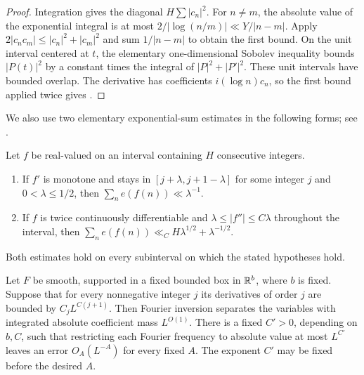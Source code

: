 \begin{proof}
Integration gives the diagonal $H\sum|c_n|^2$. For $n\ne m$, the
absolute value of the exponential integral is at most
$2/|\log(n/m)|\ll Y/|n-m|$. Apply
$2|c_nc_m|\le |c_n|^2+|c_m|^2$ and sum $1/|n-m|$ to obtain the first
bound. On the unit interval centered at $t$, the elementary
one-dimensional Sobolev inequality bounds $|P(t)|^2$ by a constant
times the integral of $|P|^2+|P'|^2$. These unit intervals have bounded
overlap. The derivative has coefficients $i(\log n)c_n$, so the first
bound applied twice gives .
\end{proof}

We also use two elementary exponential-sum estimates in the following
forms; see \cite[Corollary~16.6 and Theorem~16.7]{MontgomeryVaughanII}.

\begin{lemma}\label{lem:derivative-tests}
Let $f$ be real-valued on an interval containing $H$ consecutive
integers.
\begin{enumerate}
\item If $f'$ is monotone and stays in
$[j+\lambda,j+1-\lambda]$ for some integer $j$ and
$0<\lambda\le1/2$, then $\sum_n e(f(n))\ll\lambda^{-1}$.
\item If $f$ is twice continuously differentiable and
$\lambda\le|f''|\le C\lambda$ throughout the interval, then
$\sum_n e(f(n))\ll_C H\lambda^{1/2}+\lambda^{-1/2}$.
\end{enumerate}
Both estimates hold on every subinterval on which the stated
hypotheses hold.
\end{lemma}

\begin{lemma}\label{lem:fourier-separation}
Let $F$ be smooth, supported in a fixed bounded box in $\mathbb R^b$, where
$b$ is fixed. Suppose that for every nonnegative integer $j$ its
derivatives of order $j$ are bounded by $C_jL^{C(j+1)}$.
Then Fourier inversion separates the variables with integrated
absolute coefficient mass $L^{O(1)}$.
There is a fixed $C'>0$, depending on $b,C$, such that restricting
each Fourier frequency to absolute value at most $L^{C'}$ leaves
an error $O_A(L^{-A})$ for every fixed $A$.
The exponent $C'$ may be fixed before the desired $A$.
\end{lemma}

